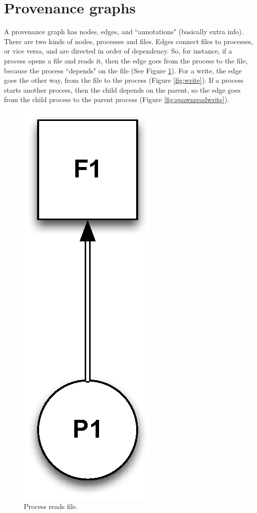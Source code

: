 \documentclass{article}
\begin{document}
\section{Provenance graphs}
A provenance graph has nodes, edges, and ``annotations" (basically extra info). There are two kinds of nodes, processes and files. Edges connect files to processes, or vice versa, and are directed in order of dependency. So, for instance, if a process opens a file and reads it, then the edge goes from the process to the file, because the process ``depends" on the file (See Figure \ref {fig:read}). For a write, the edge goes the other way, from the file to the process (Figure \ref{fig:write}). If a process starts another process, then the child depends on the parent, so the edge goes from the child process to the parent process (Figure \ref{fig:spawnreadwrite}).

%

%

\begin{figure}[h!]
  \centering
    \includegraphics[width=.25\textwidth]{figs/readfile}
      \caption{Process reads file.}
      \label{fig:read}
\end{figure}
\end{document}
